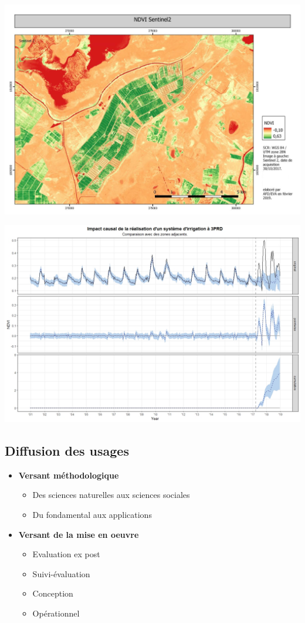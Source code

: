 \documentclass[
  letterpaper,
  DIV=11,
  numbers=noendperiod]{scrartcl}
\providecommand{\tightlist}{%
  \setlength{\itemsep}{0pt}\setlength{\parskip}{0pt}}\usepackage{longtable,booktabs,array}
\begin{document}
\includegraphics{sources/SAED_Agro.jpg}

\includegraphics[width=6.25in,height=\textheight]{sources/SAED_Stats.jpg}

\hypertarget{diffusion-des-usages}{%
\subsection{Diffusion des usages}\label{diffusion-des-usages}}

\begin{itemize}
\item
  \textbf{Versant méthodologique}

  \begin{itemize}
  \tightlist
  \item
    Des sciences naturelles aux sciences sociales
  \item
    Du fondamental aux applications
  \end{itemize}
\item
  \textbf{Versant de la mise en oeuvre}

  \begin{itemize}
  \tightlist
  \item
    Evaluation ex post
  \item
    Suivi-évaluation
  \item
    Conception
  \item
    Opérationnel
  \end{itemize}
\end{itemize}
\end{document}
